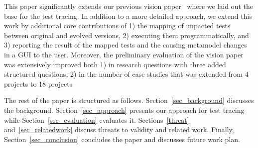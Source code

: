 This paper significantly extends our previous vision paper~\cite{Kebaili2023towards} where we laid out the base for the test tracing. In addition to a more detailed approach, we extend this work by additional core contributions of 1) the mapping of impacted tests between original and evolved versions, 2) executing them programmatically, and 3) reporting the result of the mapped tests and the causing metamodel changes in a GUI to the user. 
Moreover, the preliminary evaluation of the vision paper~\cite{Kebaili2023towards} was extensively improved both 1) in research questions with three added structured questions, 2) in the number of case studies that was extended from 4 projects to 18 projects  

The rest of the paper is structured as follows. 
Section~\ref{sec_background} discusses the background. 
Section~\ref{sec_approach} presents our approach for test tracing while Section~\ref{sec_evaluation} evaluates it.
Sections~\ref{threat} and~\ref{sec_relatedwork} discuss threats to validity and related work.
Finally, Section~\ref{sec_conclusion} concludes the paper and discusses future work plan. 
